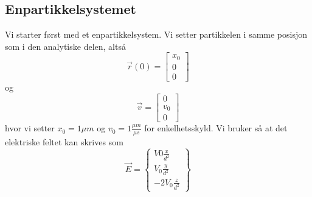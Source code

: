 \documentclass[reprint,english,notitlepage]{revtex4-1}  %
\begin{document}
\subsection*{Enpartikkelsystemet}
Vi starter først med et enpartikkelsystem. Vi setter partikkelen i samme posisjon som i den analytiske delen, altså
$$
\vec{r}(0)=\begin{bmatrix}
x_0 \\ 0 \\0
\end{bmatrix}
$$
og
$$
\vec{v}=\begin{bmatrix}
0\\v_0\\0
\end{bmatrix}
$$
hvor vi setter $x_0=1\mu m$ og $v_0=1\frac{\mu m}{\mu s}$ for enkelhetsskyld. Vi bruker så at det elektriske feltet kan skrives som
$$
\vec{E}=\begin{Bmatrix}
V0\frac{x}{d^2} \\V_0 \frac{y}{d^2}\\-2V_0 \frac{z}{d^2}
\end{Bmatrix}
$$
\end{document}
